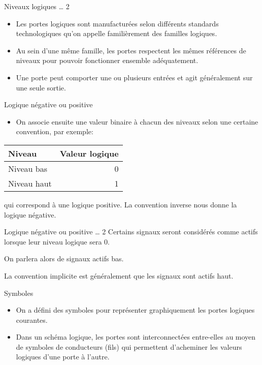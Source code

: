 \documentclass[presentation]{beamer}
\begin{document}
\begin{frame}[label={sec:org404f51b}]{Niveaux logiques \ldots{} 2}
\begin{itemize}
\item Les portes logiques sont manufacturées selon différents standards technologiques qu'on appelle familièrement des \alert{familles logiques}.

\item Au sein d'une même famille, les portes respectent les mêmes références de niveaux pour pouvoir fonctionner ensemble adéquatement.

\item Une porte peut comporter une ou plusieurs entrées et agit généralement sur une seule sortie.
\end{itemize}
\end{frame}

\begin{frame}[label={sec:org431564a}]{Logique négative ou positive}
\begin{itemize}
\item On associe ensuite une valeur binaire à chacun des niveaux selon une certaine convention, par exemple:
\end{itemize}
\begin{center}
\begin{tabular}{lr}
Niveau & Valeur logique\\
\hline
Niveau bas & 0\\
Niveau haut & 1\\
\end{tabular}
\end{center}
qui correspond à une logique positive. La convention inverse nous donne la logique négative.
\end{frame}

\begin{frame}[label={sec:orgc8e627b}]{Logique négative ou positive \ldots{} 2}
Certains signaux seront considérés comme actifs lorsque leur niveau logique sera 0.

On parlera alors de signaux \alert{actifs bas}.

La convention implicite est généralement que les signaux sont \alert{actifs haut}.
\end{frame}

\begin{frame}[label={sec:orga41af4b}]{Symboles}
\begin{itemize}
\item On a défini des symboles pour représenter graphiquement les portes logiques courantes.

\item Dans un schéma logique, les portes sont interconnectées entre-elles au moyen de symboles de conducteurs (fils) qui permettent d'acheminer les valeurs logiques d'une porte à l'autre.
\end{itemize}
\end{frame}
\end{document}
